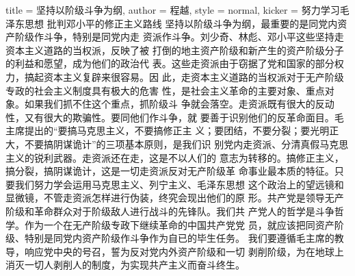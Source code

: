 \begin{hongqiarticle}{
        title  = {坚持以阶级斗争为纲},
        author = {程越},
        style  = normal,
        kicker = {努力学习毛泽东思想 批判邓小平的修正主义路线}
    }
    坚持以阶级斗争为纲，最重要的是同党内资产阶级作斗争，特别是同党内走
    资派作斗争。刘少奇、林彪、邓小平这些坚持走资本主义道路的当权派，反映了被
    打倒的地主资产阶级和新产生的资产阶级分子的利益和愿望，成为他们的政治代
    表。这些走资派由于窃据了党和国家的部分权力，搞起资本主义复辟来很容易。因
    此，走资本主义道路的当权派对于无产阶级专政的社会主义制度具有极大的危害
    性，是社会主义革命的主要对象、重点对象。如果我们抓不住这个重点，抓阶级斗
    争就会落空。走资派既有很大的反动性，又有很大的欺骗性。要同他们作斗争，就
    要善于识别他们的反革命面目。毛主席提出的“要搞马克思主义，不要搞修正主
    义；要团结，不要分裂；要光明正大，不要搞阴谋诡计”的三项基本原则，是我们识
    别党内走资派、分清真假马克思主义的锐利武器。走资派还在走，这是不以人们的
    意志为转移的。搞修正主义，搞分裂，搞阴谋诡计，这是一切走资派反对无产阶级革
    命事业最本质的特征。只要我们努力学会运用马克思主义、列宁主义、毛泽东思想
    这个政治上的望远镜和显微镜，不管走资派怎样进行伪装，终究会现出他们的原
    形。共产党是领导无产阶级和革命群众对于阶级敌人进行战斗的先锋队。我们共
    产党人的哲学是斗争哲学。作为一个在无产阶级专政下继续革命的中国共产党党
    员，就应该把同资产阶级、特别是同党内资产阶级作斗争作为自已的毕生任务。
    我们要遵循毛主席的教导，响应党中央的号召，誓为反对党内外资产阶级和一切
    剥削阶级，为在地球上消灭一切人剥削人的制度，为实现共产主义而奋斗终生。


\end{hongqiarticle}
